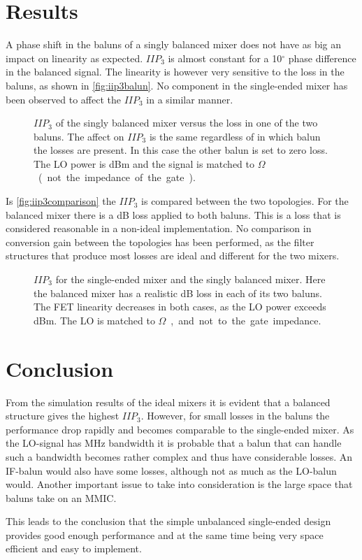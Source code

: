 	\section{Results}
		A phase shift in the baluns of a singly balanced mixer does not have as big an impact on linearity as expected. $IIP_3$ is almost constant for a 10$^\circ$ phase difference in the balanced signal. The linearity is however very sensitive to the loss in the baluns, as shown in \autoref{fig:iip3balun}. No component in the single-ended mixer has been observed to affect the $IIP_3$ in a similar manner.
		
		\begin{figure}[hbt!]
			\centering
			\caption{$IIP_3$ of the singly balanced mixer versus the loss in one of the two baluns. The affect on $IIP_3$ is the same regardless of in which balun the losses are present. In this case the other balun is set to zero loss. The LO power is \unit[12]{dBm} and the signal is matched to \unit[50]{$\Omega$} (not the impedance of the gate).}\label{fig:iip3balun}
		\end{figure}
		
		Is \autoref{fig:iip3comparison} the $IIP_3$ is compared between the two topologies. For the balanced mixer there is a \unit[2]{dB} loss applied to both baluns. This is a loss that is considered reasonable in a non-ideal implementation. No comparison in conversion gain between the topologies has been performed, as the filter structures that produce most losses are ideal and different for the two mixers.

		\begin{figure}[hpt!]
			\centering 
			\caption{$IIP_3$ for  the single-ended mixer and  the singly balanced mixer. Here the balanced mixer has a realistic \unit[2]{dB} loss in each of its two baluns. The FET linearity decreases in both cases, as the LO power exceeds \unit[14]{dBm}. The LO is matched to \unit[50]{$\Omega$}, and not to the gate impedance.}\label{fig:iip3comparison}
		\end{figure}		
		
	\section{Conclusion}
		From the simulation results of the ideal mixers it is evident that a balanced structure gives the highest $IIP_3$. However, for small losses in the baluns the performance drop rapidly and becomes comparable to the single-ended mixer. As the LO-signal has \unit[500]{MHz} bandwidth it is probable that a balun that can handle such a bandwidth becomes rather complex and thus have considerable losses. An IF-balun would also have some losses, although not as much as the LO-balun would. Another important issue to take into consideration is the large space that baluns take on an MMIC.
		
		This leads to the conclusion that the simple unbalanced single-ended design provides good enough performance and at the same time being very space efficient and easy to implement.